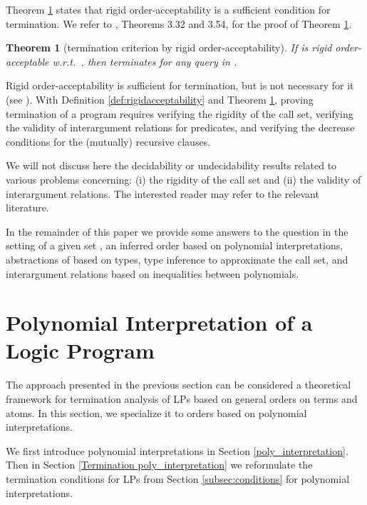 \documentclass[envcountsame]{tlp}
\newtheorem{theorem}{Theorem}
\begin{document}
Theorem \ref{thm:rigidacceptability} states that 
rigid order-acceptability is a sufficient condition for termination. 
We refer to \cite{Serebrenik03}, Theorems 3.32 and 3.54, for the 
proof of Theorem \ref{thm:rigidacceptability}.


\begin{theorem}[termination criterion by rigid order-acceptability]
\label{thm:rigidacceptability} If  is rigid
order-acceptable w.r.t.\ , then  terminates for any query in .
\end{theorem}

Rigid order-acceptability is sufficient for
termination, but is not necessary for it (see
\cite{DeSchreyeSerebrenik01}). With Definition \ref{def:rigidacceptability}
and Theorem \ref{thm:rigidacceptability}, proving termination of a program
requires verifying the rigidity of the call set, verifying the validity of interargument
relations for predicates,  and verifying the decrease conditions for the (mutually)
recursive clauses. 

We will not discuss here the decidability or undecidability results
related to various problems concerning: (i) the rigidity of the call set
and (ii) the validity of interargument relations. The interested reader may refer
to the relevant literature.

In the remainder of this paper we provide some answers to the question in the setting of
a given set , an inferred order based on polynomial interpretations, abstractions
of  based on types, type inference to approximate the call set, and
interargument relations
based on inequalities between polynomials. 



\section{Polynomial Interpretation of a Logic Program}\label{sec:interpretation}


The approach presented in the previous section can be considered a theoretical
framework for termination analysis of LPs based on general
orders on terms and atoms. In this section, we specialize it to orders
based on polynomial interpretations. 

We first introduce polynomial interpretations in Section \ref{poly_interpretation}. Then in
Section \ref{Termination poly_interpretation} we reformulate the termination
conditions for LPs from Section \ref{subsec:conditions} for polynomial interpretations. 
\end{document}
